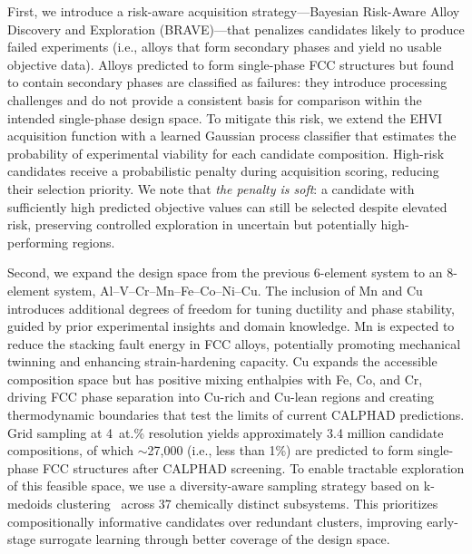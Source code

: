 \documentclass[preprint,12pt,times]{elsarticle}  %
\begin{document}
First, we introduce a risk-aware acquisition strategy---Bayesian Risk-Aware Alloy Discovery and Exploration (BRAVE)---that penalizes candidates likely to produce failed experiments (i.e., alloys that form secondary phases and yield no usable objective data). Alloys predicted to form single-phase FCC structures but found to contain secondary phases are classified as failures: they introduce processing challenges and do not provide a consistent basis for comparison within the intended single-phase design space. To mitigate this risk, we extend the EHVI acquisition function with a learned Gaussian process classifier that estimates the probability of experimental viability for each candidate composition. High-risk candidates receive a probabilistic penalty during acquisition scoring, reducing their selection priority. We note that \emph{the penalty is soft}: a candidate with sufficiently high predicted objective values can still be selected despite elevated risk, preserving controlled exploration in uncertain but potentially high-performing regions.


Second, we expand the design space from the previous 6-element system to an 8-element system, Al--V--Cr--Mn--Fe--Co--Ni--Cu. The inclusion of Mn and Cu introduces additional degrees of freedom for tuning ductility and phase stability, guided by prior experimental insights and domain knowledge. Mn is expected to reduce the stacking fault energy in FCC alloys, potentially promoting mechanical twinning and enhancing strain-hardening capacity. Cu expands the accessible composition space but has positive mixing enthalpies with Fe, Co, and Cr, driving FCC phase separation into Cu-rich and Cu-lean regions and creating thermodynamic boundaries that test the limits of current CALPHAD predictions. Grid sampling at 4~at.\% resolution yields approximately 3.4 million candidate compositions, of which $\sim$27{,}000 (i.e., less than 1\%) are predicted to form single-phase FCC structures after CALPHAD screening. To enable tractable exploration of this feasible space, we use a diversity-aware sampling strategy based on k-medoids clustering~\cite{paramore2025twoshot} across 37 chemically distinct subsystems. This prioritizes compositionally informative candidates over redundant clusters, improving early-stage surrogate learning through better coverage of the design space.

\end{document}
